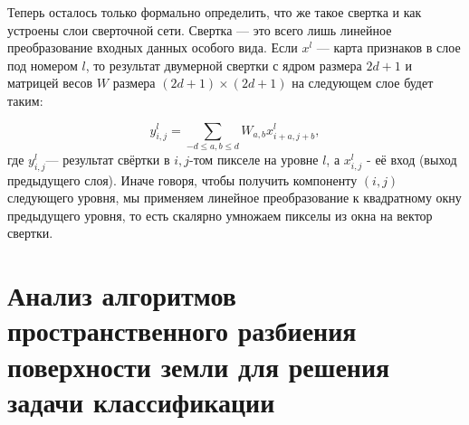 Теперь осталось только формально определить, что же такое свертка и как
устроены слои сверточной сети. Свертка — это всего лишь линейное преобразование входных данных особого вида. Если $x^l$ — карта признаков в слое под номером $l$, то результат двумерной свертки с ядром размера $2d + 1$ и матрицей весов $W$
размера $(2d + 1) × (2d + 1)$ на следующем слое будет таким:

\[
y^l_{i,j}= \sum_{-d\leqslant a ,b \leqslant d} {W_{a,b}x^l_{i+a,j+b}},
\]
где $y^l_{i,j}$--- результат свёртки в $i,j$-том пикселе на уровне $l$, 
а $x^l_{i,j}$ - её вход (выход предыдущего слоя). Иначе говоря, чтобы получить компоненту $(i,j)$ следующего уровня, мы применяем линейное преобразование к квадратному окну предыдущего уровня, то есть скалярно умножаем пикселы из окна на вектор свертки.


\section{Анализ алгоритмов пространственного разбиения поверхности земли для решения задачи классификации }

